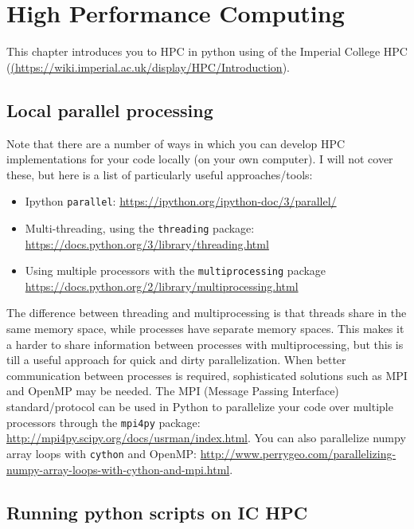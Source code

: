 \chapter{High Performance Computing}
\label{chap:HPC}

This chapter introduces you to HPC in python using of the Imperial College HPC (\url{(https://wiki.imperial.ac.uk/display/HPC/Introduction}). 

\section{Local parallel processing}

Note that there are a number of ways in which you can develop HPC implementations for your code locally (on your own computer). I will not cover these, but here is a list of particularly useful approaches/tools:

\begin{itemize}
   \item Ipython {\tt parallel}: \url{https://ipython.org/ipython-doc/3/parallel/}
  \item Multi-threading, using the {\tt threading} package: \url{https://docs.python.org/3/library/threading.html}
  \item Using multiple processors with the {\tt multiprocessing} package    \url{https://docs.python.org/2/library/multiprocessing.html} 
\end{itemize}

The difference between threading and multiprocessing is that threads share in the same memory space, while processes have separate memory spaces. This makes it a harder to share information between processes with multiprocessing, but this is till a useful approach for quick and dirty parallelization. When better communication between processes is required, sophisticated solutions such as MPI and OpenMP may be needed. The MPI (Message Passing Interface) standard/protocol can be used in Python to parallelize your code over multiple processors through the {\tt mpi4py} package: \url{http://mpi4py.scipy.org/docs/usrman/index.html}. You can also parallelize numpy array loops with {\tt cython} and OpenMP: \url{http://www.perrygeo.com/parallelizing-numpy-array-loops-with-cython-and-mpi.html}.

\section{Running python scripts on IC HPC}

